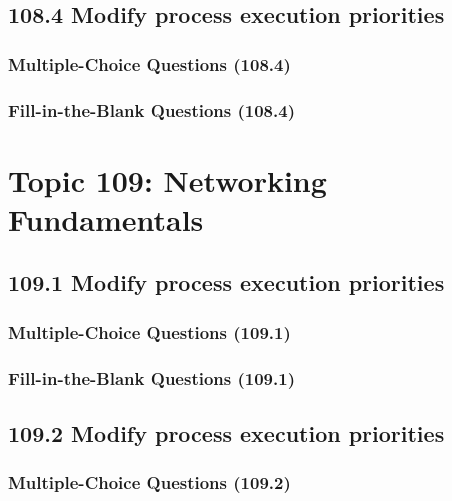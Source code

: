 \documentclass[a4paper]{report}
\begin{document}
\subsection*{108.4 Modify process execution priorities}
\subsubsection*{Multiple-Choice Questions (108.4)}

\subsubsection*{Fill-in-the-Blank Questions (108.4)}


\section*{Topic 109: Networking Fundamentals}

\subsection*{109.1 Modify process execution priorities}
\subsubsection*{Multiple-Choice Questions (109.1)}

\subsubsection*{Fill-in-the-Blank Questions (109.1)}

\subsection*{109.2 Modify process execution priorities}
\subsubsection*{Multiple-Choice Questions (109.2)}
\end{document}
